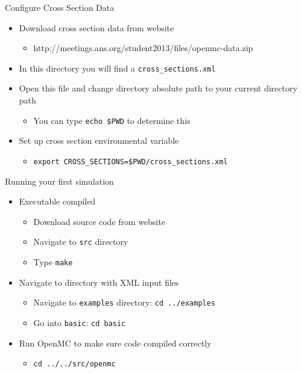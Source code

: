 \documentclass[serif]{beamer}
\begin{document}
\begin{frame}{Configure Cross Section Data}

  \begin{itemize}
    \item Download cross section data from website\vfill
      \begin{itemize}
         \item http://meetings.ans.org/student2013/files/openmc-data.zip
      \end{itemize}\vfill
    \item In this directory you will find a \texttt{cross\_sections.xml}\vfill
    \item Open this file and change directory absolute path to your current directory path
      \begin{itemize}
         \item You can type \texttt{echo \$PWD} to determine this
      \end{itemize}\vfill
    \item Set up cross section environmental variable
      \begin{itemize}
         \item \texttt{export CROSS\_SECTIONS=\$PWD/cross\_sections.xml}
      \end{itemize}
  
  \end{itemize}
\end{frame}


\begin{frame}{Running your first simulation}
  \begin{itemize}
  \item<1-> Executable compiled
    \begin{itemize}
      \item Download source code from website
      \item Navigate to \texttt{src} directory
      \item Type \texttt{make}
    \end{itemize}\vfill
  \item<1-> Navigate to directory with XML input files
    \begin{itemize}
      \item Navigate to \texttt{examples} directory: \texttt{cd ../examples}
      \item Go into \texttt{basic}: \texttt{cd basic}
    \end{itemize}\vfill
  \item<1-> Run OpenMC to make sure code compiled correctly
     \begin{itemize}
       \item \texttt{cd ../../src/openmc}
     \end{itemize}
  \end{itemize}
\end{frame}
\end{document}
